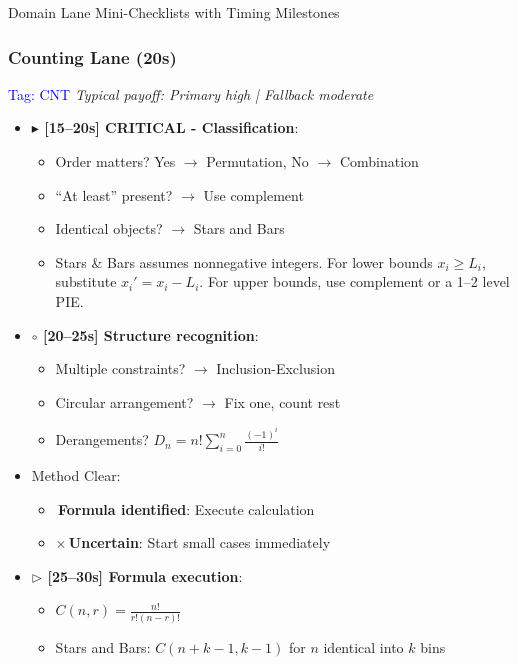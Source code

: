 \documentclass{article}
\begin{document}
\begin{classifybox}{Domain Lane Mini-Checklists with Timing Milestones}
     \subsubsection{Counting Lane (20s)}
     {\footnotesize\textcolor{timegreen}{}}\quad\textcolor{blue}{Tag: CNT}
      \textit{Typical payoff: Primary high | Fallback moderate}
      \begin{itemize}[nosep]
      \item \textbf{$\blacktriangleright$ [15--20s] CRITICAL - Classification}:
        \begin{itemize}[nosep]
        \item Order matters? Yes $\rightarrow$ Permutation, No $\rightarrow$ Combination
        \item ``At least'' present? $\rightarrow$ Use complement
        \item Identical objects? $\rightarrow$ Stars and Bars
        \item Stars \& Bars assumes nonnegative integers. For lower bounds $x_i \ge L_i$, substitute $x_i' = x_i - L_i$. For upper bounds, use complement or a 1--2 level PIE.
        \end{itemize}
      \item \textbf{$\circ$ [20--25s] Structure recognition}:
        \begin{itemize}[nosep]
        \item Multiple constraints? $\rightarrow$ Inclusion-Exclusion
        \item Circular arrangement? $\rightarrow$ Fix one, count rest
        \item Derangements? $D_n = n!\sum_{i=0}^n \frac{(-1)^i}{i!}$
        \end{itemize}
      \item {} Method Clear:
        \begin{itemize}[nosep]
        \item \checkmark\,\textbf{Formula identified}: Execute calculation
        \item $\times$\,\textbf{Uncertain}: Start small cases immediately
        \end{itemize}
      \item \textbf{$\triangleright$ [25--30s] Formula execution}:
        \begin{itemize}[nosep]
        \item $C(n,r) = \frac{n!}{r!(n-r)!}$
        \item Stars and Bars: $C(n+k-1, k-1)$ for $n$ identical into $k$ bins

\end{itemize}
\end{itemize}
\end{classifybox}
\end{document}
